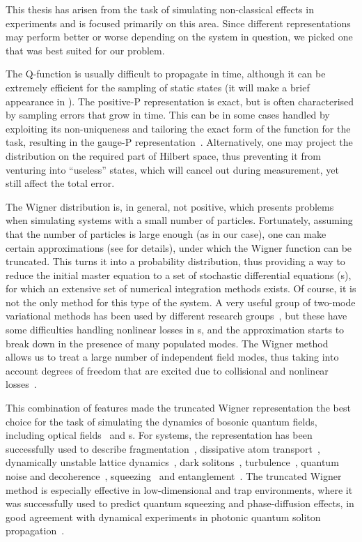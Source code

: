 This thesis has arisen from the task of simulating non-classical effects in  experiments and is focused primarily on this area.
Since different representations may perform better or worse depending on the system in question, we picked one that was best suited for our problem.

The Q-function is usually difficult to propagate in time, although it can be extremely efficient for the sampling of static states (it will make a brief appearance in ).
The positive-P representation is exact, but is often characterised by sampling errors that grow in time.
This can be in some cases handled by exploiting its non-uniqueness and tailoring the exact form of the function for the task, resulting in the gauge-P representation~\cite{Deuar2002}.
Alternatively, one may project the distribution on the required part of Hilbert space, thus preventing it from venturing into ``useless'' states, which will cancel out during measurement, yet still affect the total error.

The Wigner distribution is, in general, not positive, which presents problems when simulating systems with a small number of particles.
Fortunately, assuming that the number of particles is large enough (as in our case), one can make certain approximations (see  for details), under which the Wigner function can be truncated.
This turns it into a probability distribution, thus providing a way to reduce the initial master equation to a set of stochastic differential equations (s), for which an extensive set of numerical integration methods exists.
Of course, it is not the only method for this type of the system.
A very useful group of two-mode variational methods has been used by different research groups~\cite{Li2008,Li2009,Sinatra2011}, but these have some difficulties handling nonlinear losses in s, and the approximation starts to break down in the presence of many populated modes.
The Wigner method allows us to treat a large number of independent field modes, thus taking into account degrees of freedom that are excited due to collisional and nonlinear losses~\cite{Norrie2005,Deuar2007}.

This combination of features made the truncated Wigner representation the best choice for the task of simulating the dynamics of bosonic quantum fields, including optical fields~\cite{Drummond1993,Drummond1993a,Corney2006,Corney2008} and s.
For  systems, the representation has been successfully used to describe fragmentation~\cite{Isella2005,Isella2006,Gross2011}, dissipative atom transport~\cite{Ruostekoski2005}, dynamically unstable lattice dynamics~\cite{Shrestha2009}, dark solitons~\cite{Martin2010,Martin2010a}, turbulence~\cite{Norrie2005,Norrie2006}, quantum noise and decoherence~\cite{Steel1998,Norrie2006a,Egorov2011}, squeezing~\cite{Opanchuk2012} and entanglement~\cite{Opanchuk2012a}.
The truncated Wigner method is especially effective in low-dimensional and trap environments, where it was successfully used to predict quantum squeezing and phase-diffusion effects, in good agreement with dynamical experiments in photonic quantum soliton propagation~\cite{Carter1987,Corney2008}.

